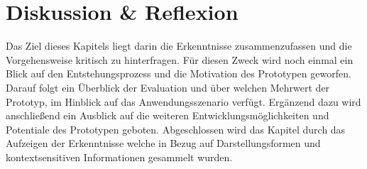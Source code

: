 \documentclass[Bachelorarbeit.tex]{subfiles}
\begin{document}
\chapter{Diskussion \& Reflexion}
\label{chap:reflexion}

\label{chap:reflexion:sec:zusammenfassung}

\begin{comment}
\ideas{Interviews: mehr Personen anderer Modus?}
\ideas{Evaluation Gruppeneinteilung, Modus}
\ideas{Leaflet.js}
\end{comment}


Das Ziel dieses Kapitels liegt darin die Erkenntnisse zusammenzufassen und die Vorgehensweise kritisch zu hinterfragen.
Für diesen Zweck wird noch einmal ein Blick auf den Entstehungsprozess und die Motivation des Prototypen geworfen.
Darauf folgt ein Überblick der Evaluation und über welchen Mehrwert der Prototyp, im Hinblick auf das Anwendungsszenario verfügt.
Ergänzend dazu wird anschließend ein Ausblick auf die weiteren Entwicklungsmöglichkeiten und Potentiale des Prototypen geboten. 
Abgeschlossen wird das Kapitel durch das Aufzeigen der Erkenntnisse welche in Bezug auf Darstellungsformen und kontextsensitiven Informationen gesammelt wurden.
\end{document}
